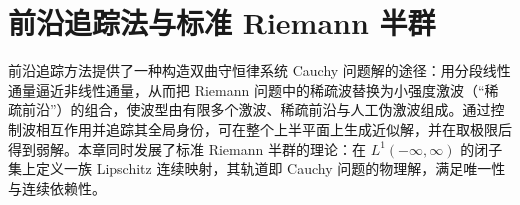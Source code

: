 \documentclass[../main.tex]{subfiles}
\begin{document}
\chapter{前沿追踪法与标准 Riemann 半群}\label{chapter:ch14-前沿追踪与标准riemann半群}

前沿追踪方法提供了一种构造双曲守恒律系统 Cauchy 问题解的途径：用分段线性通量逼近非线性通量，从而把 Riemann 问题中的稀疏波替换为小强度激波（``稀疏前沿''）的组合，使波型由有限多个激波、稀疏前沿与人工伪激波组成。通过控制波相互作用并追踪其全局身份，可在整个上半平面上生成近似解，并在取极限后得到弱解。本章同时发展了标准 Riemann 半群的理论：在 $L^1(-\infty,\infty)$ 的闭子集上定义一族 Lipschitz 连续映射，其轨道即 Cauchy 问题的物理解，满足唯一性与连续依赖性。














\end{document}
